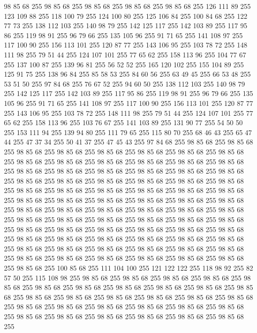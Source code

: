 98 85 68 255 98 85 68 255 98 85 68 255 98 85 68 255 98 85 68 255 126 111 89 255 123 109 88 255 118 100 79 255 124 100 80 255 125 106 84 255 100 84 68 255 122 77 73 255 138 112 103 255 140 98 79 255 142 125 117 255 142 103 89 255 117 95 86 255 119 98 91 255 96 79 66 255 135 105 96 255 91 71 65 255 141 108 97 255 117 100 90 255 156 113 101 255 120 87 77 255 143 106 95 255 103 78 72 255 148 111 98 255 79 51 44 255 124 107 101 255 77 65 62 255 158 113 96 255 104 77 67 255 137 100 87 255 139 96 81 255 56 52 52 255 165 120 102 255 155 104 89 255 125 91 75 255 138 96 84 255 85 58 53 255 84 60 56 255 63 49 45 255 66 53 48 255 53 51 50 255 97 84 68 255 76 67 52 255 94 60 50 255 138 112 103 255 140 98 79 255 142 125 117 255 142 103 89 255 117 95 86 255 119 98 91 255 96 79 66 255 135 105 96 255 91 71 65 255 141 108 97 255 117 100 90 255 156 113 101 255 120 87 77 255 143 106 95 255 103 78 72 255 148 111 98 255
79 51 44 255 124 107 101 255 77 65 62 255 158 113 96 255 103 76 67 255 141 103 89 255 131 90 77 255 54 50 50 255 153 111 94 255 139 94 80 255 111 79 65 255 115 80 70 255 68 46 43 255 65 47 44 255 47 37 34 255 50 41 37 255 47 45 43 255 97 84 68 255 98 85 68 255 98 85 68 255 98 85 68 255 98 85 68 255 98 85 68 255 98 85 68 255 98 85 68 255 98 85 68 255 98 85 68 255 98 85 68 255 98 85 68 255 98 85 68 255 98 85 68 255 98 85 68 255 98 85 68 255 98 85 68 255 98 85 68 255 98 85 68 255 98 85 68 255 98 85 68 255 98 85 68 255 98 85 68 255 98 85 68 255 98 85 68 255 98 85 68 255 98 85 68 255 98 85 68 255 98 85 68 255 98 85 68 255 98 85 68 255 98 85 68 255 98 85 68 255 98 85 68 255 98 85 68 255 98 85 68 255 98 85 68 255 98 85 68 255 98 85 68 255 98 85 68 255 98 85 68 255 98 85 68 255 98 85 68 255 98 85 68 255 98 85 68 255 98 85 68 255 98 85 68 255
98 85 68 255 98 85 68 255 98 85 68 255 98 85 68 255 98 85 68 255 98 85 68 255 98 85 68 255 98 85 68 255 98 85 68 255 98 85 68 255 98 85 68 255 98 85 68 255 98 85 68 255 98 85 68 255 98 85 68 255 98 85 68 255 98 85 68 255 98 85 68 255 98 85 68 255 98 85 68 255 98 85 68 255 98 85 68 255 98 85 68 255 98 85 68 255 98 85 68 255 98 85 68 255 98 85 68 255 98 85 68 255 98 85 68 255 100 85 68 255 111 104 100 255 121 122 122 255 118 98 92 255 82 57 50 255 115 108 98 255 98 85 68 255 98 85 68 255 98 85 68 255 98 85 68 255 98 85 68 255 98 85 68 255 98 85 68 255 98 85 68 255 98 85 68 255 98 85 68 255 98 85 68 255 98 85 68 255 98 85 68 255 98 85 68 255 98 85 68 255 98 85 68 255 98 85 68 255 98 85 68 255 98 85 68 255 98 85 68 255 98 85 68 255 98 85 68 255 98 85 68 255 98 85 68 255 98 85 68 255 98 85 68 255 98 85 68 255 98 85 68 255 98 85 68 255
